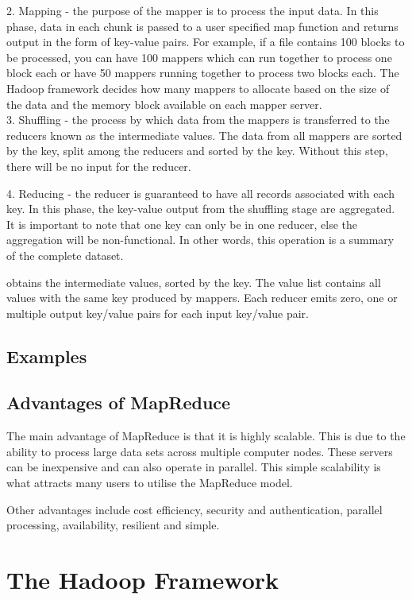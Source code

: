 \documentclass[11pt]{book}
\begin{document}
2. Mapping - the purpose of the mapper is to process the input data. In this phase, data in each chunk is passed to a user specified map function and returns output in the form of key-value pairs. For example, if a file contains 100 blocks to be processed, you can have 100 mappers which can run together to process one block each or have 50 mappers running together to process two blocks each. The Hadoop framework decides how many mappers to allocate based on the size of the data and the memory block available on each mapper server.\\

3. Shuffling - the process by which data from the mappers is transferred to the reducers known as the intermediate values. The data from all mappers are sorted by the key, split among the reducers and sorted by the key. Without this step, there will be no input for the reducer.

4. Reducing - the reducer is guaranteed to have all records associated with each key. In this phase, the key-value output from the shuffling stage are aggregated.  It is important to note that one key can only be in one reducer, else the aggregation will be non-functional. In other words, this operation is a summary of the complete dataset. 

obtains the intermediate values, sorted by the key. The value list contains all values with the same key produced by mappers. Each reducer emits zero, one or multiple output key/value pairs for each input key/value pair.


\section{Examples}



\section{Advantages of MapReduce}

The main advantage of MapReduce is that it is highly scalable. This is due to the ability to process large data sets across multiple computer nodes. These servers can be inexpensive and can also operate in parallel. This simple scalability is what attracts many users to utilise the MapReduce model.

Other advantages include cost efficiency, security and authentication, parallel processing, availability, resilient and simple.


\chapter{The Hadoop Framework}
\end{document}

